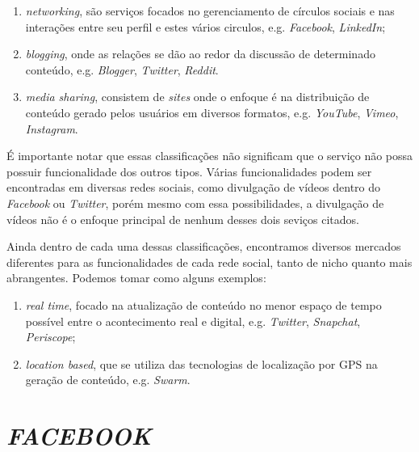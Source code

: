 \begin{enumerate}
	\item \textit{\textit{networking}}, são serviços focados no gerenciamento de círculos sociais e nas interações entre seu perfil e estes vários circulos, e.g. \textit{Facebook}, \textit{LinkedIn};
	\item \textit{\textit{blogging}}, onde as relações se dão ao redor da discussão de determinado conteúdo, e.g. \textit{Blogger}, \textit{Twitter}, \textit{Reddit}.
	\item \textit{\textit{media sharing}}, consistem de \textit{sites} onde o enfoque é na distribuição de conteúdo gerado pelos usuários em diversos formatos, e.g. \textit{YouTube}, \textit{Vimeo}, \textit{Instagram}.
\end{enumerate} 

É importante notar que essas classificações não significam que o serviço não possa possuir funcionalidade dos outros tipos. Várias funcionalidades podem ser encontradas em diversas redes sociais, como divulgação de vídeos dentro do \textit{Facebook} ou \textit{Twitter}, porém mesmo com essa possibilidades, a divulgação de vídeos não é o enfoque principal de nenhum desses dois seviços citados.

Ainda dentro de cada uma dessas classificações, encontramos diversos mercados diferentes para as funcionalidades de cada rede social, tanto de nicho quanto mais abrangentes. Podemos tomar como alguns exemplos:

\begin{enumerate}
	\item \textit{\textit{real time}}, focado na atualização de conteúdo no menor espaço de tempo possível entre o acontecimento real e digital, e.g. \textit{Twitter}, \textit{Snapchat}, \textit{Periscope};
	\item \textit{\textit{location based}}, que se utiliza das tecnologias de localização por GPS na geração de conteúdo, e.g. \textit{Swarm}.
\end{enumerate}

%
%

\section{\textit{FACEBOOK}}
\label{sec:facebookRedesSociais}

